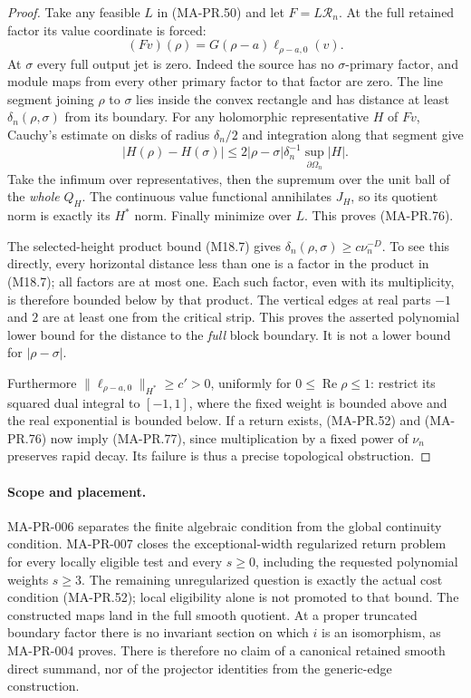 \begin{proof}
Take any feasible \(L\) in (MA-PR.50) and let
\(F=L\mathscr R_n\).
At the full retained factor its value coordinate is forced:
\[
                  (Fv)(\rho)=G(\rho-a)\ell_{\rho-a,0}(v).
 \tag{MA-PR.78}
\]
At \(\sigma\) every full output jet is zero.
Indeed the source has no \(\sigma\)-primary factor,
and module maps from every other primary factor
to that factor are zero.
The line segment joining \(\rho\) to \(\sigma\)
lies inside the convex rectangle and has distance
at least \(\delta_n(\rho,\sigma)\) from its boundary.
For any holomorphic representative \(H\) of \(Fv\),
Cauchy's estimate on disks of radius \(\delta_n/2\)
and integration along that segment give
\[
 |H(\rho)-H(\sigma)|
       \le 2|\rho-\sigma|\delta_n^{-1}
                            \sup_{\partial\Omega_n}|H| .
 \tag{MA-PR.79}
\]
Take the infimum over representatives, then the
supremum over the unit ball of the \emph{whole}
\(Q_H\).  The continuous value functional annihilates
\(J_H\), so its quotient norm is exactly its \(H^*\)
norm.  Finally minimize over \(L\).
This proves (MA-PR.76).

The selected-height product bound (M18.7) gives
\(\delta_n(\rho,\sigma)\ge c\nu_n^{-D}\).
To see this directly, every horizontal distance
less than one is a factor in the product in (M18.7);
all factors are at most one.  Each such factor,
even with its multiplicity, is therefore bounded
below by that product.  The vertical edges
at real parts \(-1\) and \(2\) are at least one
from the critical strip.  This proves the asserted
polynomial lower bound for the distance to the
\emph{full} block boundary.  It is not a lower
bound for \(|\rho-\sigma|\).

Furthermore \(\|\ell_{\rho-a,0}\|_{H^*}\ge c'>0\),
uniformly for \(0\le\operatorname{Re}\rho\le1\):
restrict its squared dual integral to \([-1,1]\),
where the fixed weight is bounded above and
the real exponential is bounded below.
If a return exists, (MA-PR.52) and (MA-PR.76)
now imply (MA-PR.77), since multiplication by a
fixed power of \(\nu_n\) preserves rapid decay.
Its failure is thus a precise topological obstruction.
\end{proof}

\paragraph{Scope and placement.}
MA-PR-006 separates the finite algebraic condition
from the global continuity condition.  MA-PR-007
closes the exceptional-width regularized return problem
for every locally eligible test and every \(s\ge0\),
including the requested polynomial weights \(s\ge3\).
The remaining unregularized question is exactly
the actual cost condition (MA-PR.52); local eligibility
alone is not promoted to that bound.
The constructed maps land in the full smooth quotient.
At a proper truncated boundary factor there is no
invariant section on which \(i\) is an isomorphism,
as MA-PR-004 proves.
There is therefore no claim of a canonical retained
smooth direct summand, nor of the projector identities
from the generic-edge construction.

